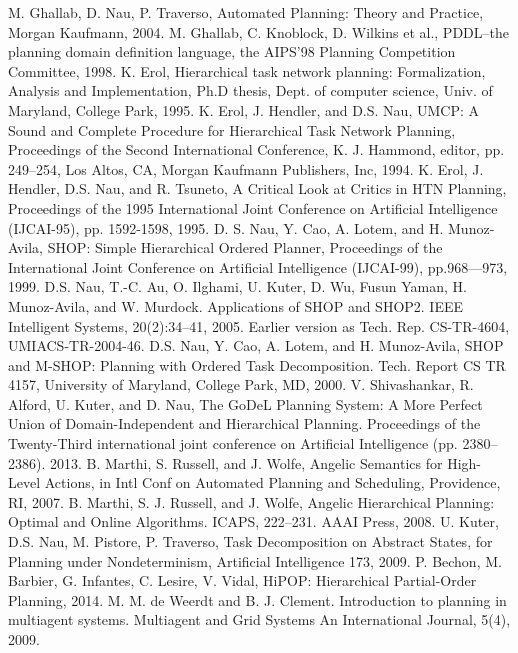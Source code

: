 \begin{thebibliography}{99}
 M. Ghallab, D. Nau, P. Traverso, Automated Planning: Theory and Practice, Morgan Kaufmann, 2004.  %
 M. Ghallab, C. Knoblock, D. Wilkins et al., PDDL–the planning domain definition language, the AIPS’98 Planning Competition Committee, 1998.
 K. Erol, Hierarchical task network planning: Formalization, Analysis and Implementation, Ph.D thesis, Dept. of computer science, Univ. of Maryland, College Park, 1995.
 K. Erol, J. Hendler, and D.S. Nau, UMCP: A Sound and Complete Procedure for Hierarchical Task Network Planning, Proceedings of the Second International Conference, K. J. Hammond, editor, pp. 249–254, Los Altos, CA, Morgan Kaufmann Publishers, Inc, 1994.
 K. Erol, J. Hendler, D.S. Nau, and R. Tsuneto, A Critical Look at Critics in HTN Planning, Proceedings of the 1995 International Joint Conference on Artificial Intelligence (IJCAI-95), pp. 1592-1598, 1995.
 D. S. Nau, Y. Cao, A. Lotem, and H. Munoz-Avila, SHOP: Simple Hierarchical Ordered Planner, Proceedings of the International Joint Conference on Artificial Intelligence (IJCAI-99), pp.968—973, 1999.
 D.S. Nau, T.-C. Au, O. Ilghami, U. Kuter, D. Wu, Fusun Yaman, H. Munoz-Avila, and W. Murdock. Applications of SHOP and SHOP2. IEEE Intelligent Systems, 20(2):34–41, 2005. Earlier version as Tech. Rep. CS-TR-4604, UMIACS-TR-2004-46.
 D.S. Nau, Y. Cao, A. Lotem, and H. Munoz-Avila, SHOP and M-SHOP: Planning with Ordered Task Decomposition. Tech. Report CS TR 4157, University of Maryland, College Park, MD, 2000.
 V. Shivashankar, R. Alford, U. Kuter, and D. Nau, The GoDeL Planning System: A More Perfect Union of Domain-Independent and Hierarchical Planning. Proceedings of the Twenty-Third international joint conference on Artiﬁcial Intelligence (pp. 2380–2386). 2013.
 B. Marthi, S. Russell, and J. Wolfe, Angelic Semantics for High-Level Actions, in Intl Conf on Automated Planning and Scheduling,
Providence, RI, 2007.
 B. Marthi, S. J. Russell, and J. Wolfe, Angelic Hierarchical Planning: Optimal and Online Algorithms. ICAPS, 222–231. AAAI Press, 2008.
 U. Kuter, D.S. Nau, M. Pistore, P. Traverso, Task Decomposition on Abstract States, for Planning under Nondeterminism, Artiﬁcial Intelligence 173, 2009.
 P. Bechon, M. Barbier, G. Infantes, C. Lesire, V. Vidal, HiPOP: Hierarchical Partial-Order Planning, 2014.
 M. M. de Weerdt and B. J. Clement. Introduction to planning in multiagent systems. Multiagent and Grid Systems An International Journal, 5(4), 2009.

\end{thebibliography}
